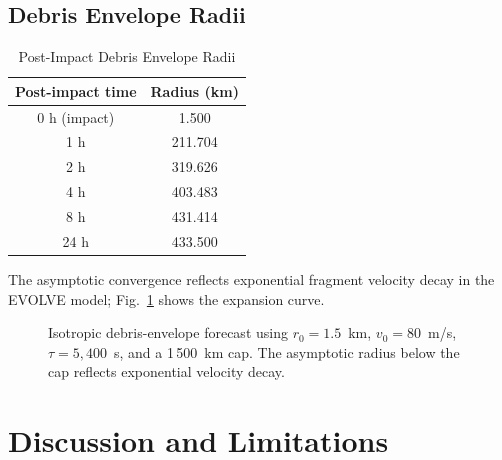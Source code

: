 \documentclass[conference]{IEEEtran}
\begin{document}
\subsection{Debris Envelope Radii}

\begin{table}[h]
\caption{Post-Impact Debris Envelope Radii}
\label{tab:debris_radii}
\centering
\footnotesize
\begin{tabular}{@{}cc@{}}
\toprule
\textbf{Post-impact time} & \textbf{Radius (km)} \\
\midrule
0 h (impact) & 1.500   \\
1 h          & 211.704 \\
2 h          & 319.626 \\
4 h          & 403.483 \\
8 h          & 431.414 \\
24 h         & 433.500 \\
\bottomrule
\end{tabular}
\end{table}

The asymptotic convergence reflects exponential fragment velocity decay in the
EVOLVE model; Fig.~\ref{fig:debris_envelope} shows the expansion curve.

\begin{figure}[h]
\centering
{}
\caption{Isotropic debris-envelope forecast using $r_0 = 1.5$~km,
$v_0 = 80$~m/s, $\tau = 5{,}400$~s, and a 1\,500~km cap. The asymptotic
radius below the cap reflects exponential velocity decay.}
\label{fig:debris_envelope}
\end{figure}

\section{Discussion and Limitations}
\label{sec:discussion}
\end{document}
